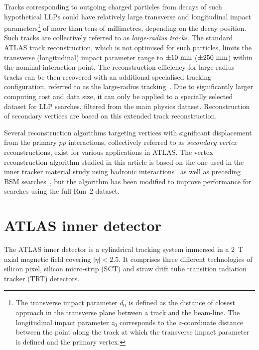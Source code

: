 \documentclass[PUB,UKenglish, texlive=2018]{\ATLASLATEXPATH atlasdoc}
\begin{document}
Tracks corresponding to outgoing charged particles from decays of such hypothetical LLPs could have relatively large transverse and longitudinal impact parameters\footnote{The transverse impact parameter $d_{0}$
is defined as the distance of closest approach in the transverse plane between a track and the beam-line. The longitudinal impact parameter $z_{0}$ corresponds to the $z$-coordinate distance between the point 
along the track at which the transverse impact parameter is defined and the primary vertex.} of more than tens of millimetres, depending on the decay position. Such tracks are collectively referred to as \emph{large-radius  tracks}.
The standard ATLAS track reconstruction, which is not optimised for such particles, limits the transverse (longitudinal) impact parameter range to $\pm10~{\rm mm}$ ($\pm250~{\rm mm}$) within the nominal interaction point.
The reconstruction efficiency for large-radius tracks can be then recovered with an additional specialised tracking configuration, referred to as the large-radius tracking~\cite{ATL-PHYS-PUB-2017-014}. 
Due to significantly larger computing cost and data size, it can only be applied to a specially selected dataset for LLP searches, filtered from the main physics dataset. 
Reconstruction of secondary vertices are based on this extended track reconstruction.

Several reconstruction algorithms targeting vertices with significant displacement from the primary $pp$ interactions, collectively referred to as \emph{secondary vertex} reconstructions, exist for various applications in ATLAS. 
The vertex reconstruction algorithm studied in this article is based on the one used in the inner tracker material study using hadronic interactions~\cite{ATLAS-CONF-2010-058,Aaboud:2016poq,Aaboud:2017pjd} 
as well as preceding BSM searches~\cite{Aaboud:2017iio,Aad:2015rba,Aad:2011zb,Aad:2012zx}, but the algorithm has been modified to improve performance for searches using the full Run~2 dataset.




\section{ATLAS inner detector}


The ATLAS inner detector is a cylindrical tracking system immersed in a 2~T axial magnetic field covering $|\eta|<2.5$. 
It comprises three different technologies of silicon pixel, silicon micro-strip (SCT) and straw drift tube transition radiation tracker (TRT) detectors.
\end{document}
